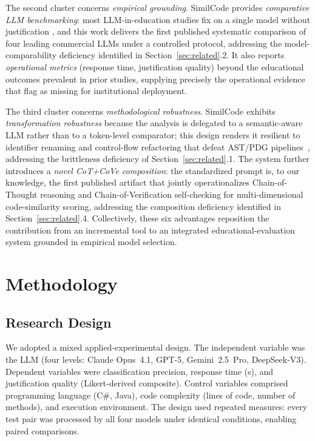 \documentclass[twocolumn,11pt]{article}
\begin{document}
    The second cluster concerns \emph{empirical grounding}. SimilCode provides \emph{comparative LLM benchmarking}: most LLM-in-education studies fix on a single model without justification \citep{jost2024impact,lepp2025does,kazemitabaar2023novices}, and this work delivers the first published systematic comparison of four leading commercial LLMs under a controlled protocol, addressing the model-comparability deficiency identified in Section~\ref{sec:related}.2. It also reports \emph{operational metrics} (response time, justification quality) beyond the educational outcomes prevalent in prior studies, supplying precisely the operational evidence that \citet{vanviet2024large} flag as missing for institutional deployment.
     
    The third cluster concerns \emph{methodological robustness}. SimilCode exhibits \emph{transformation robustness} because the analysis is delegated to a semantic-aware LLM rather than to a token-level comparator; this design renders it resilient to identifier renaming and control-flow refactoring that defeat AST/PDG pipelines~\citep{ebrahim2024semantic}, addressing the brittleness deficiency of Section~\ref{sec:related}.1. The system further introduces a \emph{novel CoT+CoVe composition}: the standardized prompt is, to our knowledge, the first published artifact that jointly operationalizes Chain-of-Thought reasoning and Chain-of-Verification self-checking for multi-dimensional code-similarity scoring, addressing the composition deficiency identified in Section~\ref{sec:related}.4. Collectively, these six advantages reposition the contribution from an incremental tool to an integrated educational-evaluation system grounded in empirical model selection.
    \section{Methodology}\label{sec:methodology}
    \subsection{Research Design}
    We adopted a mixed applied-experimental design. The independent variable was the LLM (four levels: Claude Opus~4.1, GPT-5, Gemini~2.5~Pro, DeepSeek-V3). Dependent variables were classification precision, response time (s), and justification quality (Likert-derived composite). Control variables comprised programming language (C\#, Java), code complexity (lines of code, number of methods), and execution environment. The design used repeated measures: every test pair was processed by all four models under identical conditions, enabling paired comparisons.
\end{document}
